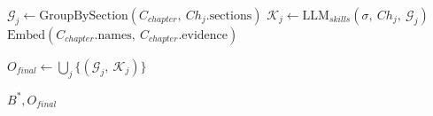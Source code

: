 \begin{algorithm}
\begin{algorithmic}[1]
    \State $\mathcal{G}_j \leftarrow \text{GroupBySection}(C_{chapter},\ Ch_j.\text{sections})$
    \State $\mathcal{K}_j \leftarrow \text{LLM}_{skills}(\sigma,\ Ch_j,\ \mathcal{G}_j)$
    \State $\text{Embed}(C_{chapter}.\text{names},\ C_{chapter}.\text{evidence})$
\EndFor

\State $O_{final} \leftarrow \bigcup_j \{(\mathcal{G}_j,\ \mathcal{K}_j)\}$

\State \Return $B^*, O_{final}$
\end{algorithmic}
\end{algorithm}
